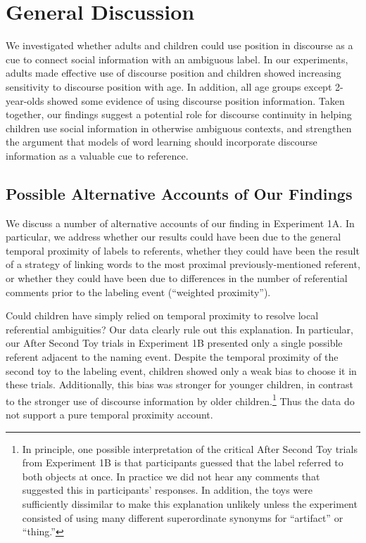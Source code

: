 \documentclass[man]{apa2}
\begin{document}
\section{General Discussion} 

We investigated whether adults and children could use position in discourse as a cue to connect social information with an ambiguous label. In our experiments, adults made effective use of discourse position and children showed increasing sensitivity to discourse position with age. In addition, all age groups except 2-year-olds showed some evidence of using discourse position information. Taken together, our findings suggest a potential role for discourse continuity in helping children use social information in otherwise ambiguous contexts, and strengthen the argument that models of word learning should incorporate discourse information as a valuable cue to reference.

\subsection{Possible Alternative Accounts of Our Findings}

We discuss a number of alternative accounts of our finding in Experiment 1A. In particular, we address whether our results could have been due to the general temporal proximity of labels to referents, whether they could have been the result of a strategy of linking words to the most proximal previously-mentioned referent, or whether they could have been due to differences in the number of referential comments prior to the labeling event (``weighted proximity''). 

Could children have simply relied on temporal proximity to resolve local referential ambiguities? Our data clearly rule out this explanation. In particular, our After Second Toy trials in Experiment 1B presented only a single possible referent adjacent to the naming event.  Despite the temporal proximity of the second toy to the labeling event, children showed only a weak bias to choose it in these trials.  Additionally, this bias was stronger for younger children, in contrast to the stronger use of discourse information by older children.\footnote{In principle, one possible interpretation of the critical After Second Toy trials from Experiment 1B is that participants guessed that the label referred to both objects at once. In practice we did not hear any comments that suggested this in participants' responses. In addition, the toys were sufficiently dissimilar to make this explanation unlikely unless the experiment consisted of using many different superordinate synonyms for ``artifact'' or ``thing.''} Thus the data do not support a pure temporal proximity account.
\end{document}
